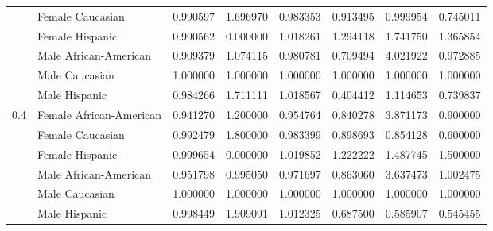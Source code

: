 \begin{tabular}{llrrrrrr}
    & Female Caucasian &         0.990597 &       1.696970 &             0.983353 &       0.913495 &       0.999954 &       0.745011 \\
    & Female Hispanic &         0.990562 &       0.000000 &             1.018261 &       1.294118 &       1.741750 &       1.365854 \\
    & Male African-American &         0.909379 &       1.074115 &             0.980781 &       0.709494 &       4.021922 &       0.972885 \\
    & Male Caucasian &         1.000000 &       1.000000 &             1.000000 &       1.000000 &       1.000000 &       1.000000 \\
    & Male Hispanic &         0.984266 &       1.711111 &             1.018567 &       0.404412 &       1.114653 &       0.739837 \\
0.4 & Female African-American &         0.941270 &       1.200000 &             0.954764 &       0.840278 &       3.871173 &       0.900000 \\
    & Female Caucasian &         0.992479 &       1.800000 &             0.983399 &       0.898693 &       0.854128 &       0.600000 \\
    & Female Hispanic &         0.999654 &       0.000000 &             1.019852 &       1.222222 &       1.487745 &       1.500000 \\
    & Male African-American &         0.951798 &       0.995050 &             0.971697 &       0.863060 &       3.637473 &       1.002475 \\
    & Male Caucasian &         1.000000 &       1.000000 &             1.000000 &       1.000000 &       1.000000 &       1.000000 \\
    & Male Hispanic &         0.998449 &       1.909091 &             1.012325 &       0.687500 &       0.585907 &       0.545455 \\
\bottomrule
\end{tabular}
